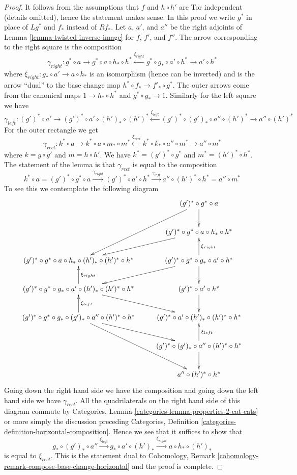\documentclass[10pt,a4paper]{amsart}
\theoremstyle{plain}
\theoremstyle{definition}
\theoremstyle{remark}
\numberwithin{equation}{subsection}
\begin{document}
\begin{proof}
It follows from the assumptions that $f$ and $h \circ h'$ are Tor
independent (details omitted), hence the statement makes sense.
In this proof we write $g^*$ in place of $Lg^*$ and $f_*$ instead
of $Rf_*$. Let $a$, $a'$, and $a''$ be the right adjoints of
Lemma \ref{lemma-twisted-inverse-image}
for $f$, $f'$, and $f''$. The arrow corresponding to the right
square is the composition
$$
\gamma_{right} :
g^* \circ a \to g^* \circ a \circ h_* \circ h^*
\xleftarrow{\xi_{right}} g^* \circ g_* \circ a' \circ h^* \to a' \circ h^*
$$
where $\xi_{right} : g_* \circ a' \to a \circ h_*$
is an isomorphism (hence can be inverted)
and is the arrow ``dual'' to the base change map
$h^* \circ f_* \to f'_* \circ g^*$. The outer arrows come
from the canonical maps $1 \to h_* \circ h^*$ and $g^* \circ g_* \to 1$.
Similarly for the left square we have
$$
\gamma_{left} :
(g')^* \circ a' \to (g')^* \circ a' \circ (h')_* \circ (h')^*
\xleftarrow{\xi_{left}}
(g')^* \circ (g')_* \circ a'' \circ (h')^* \to a'' \circ (h')^*
$$
For the outer rectangle we get
$$
\gamma_{rect} :
k^* \circ a \to
k^* \circ a \circ m_* \circ m^* \xleftarrow{\xi_{rect}}
k^* \circ k_* \circ a'' \circ m^* \to
a'' \circ m^*
$$
where $k = g \circ g'$ and $m = h \circ h'$.
We have $k^* = (g')^* \circ g^*$ and $m^* = (h')^* \circ h^*$.
The statement of the lemma is that $\gamma_{rect}$
is equal to the composition
$$
k^* \circ a =
(g')^* \circ g^* \circ a \xrightarrow{\gamma_{right}}
(g')^* \circ a' \circ h^* \xrightarrow{\gamma_{left}}
a'' \circ (h')^* \circ h^* = a'' \circ m^*
$$
To see this we contemplate the following diagram
$$
\xymatrix{
& (g')^* \circ g^* \circ a \ar[d] \ar[ddl] \\
& (g')^* \circ g^* \circ a \circ h_* \circ h^* \ar[ld] \\
(g')^* \circ g^* \circ a \circ h_* \circ (h')_* \circ (h')^* \circ h^* &
(g')^* \circ g^* \circ g_* \circ a' \circ h^*
\ar[u]_{\xi_{right}} \ar[d] \ar[ld] \\
(g')^* \circ g^* \circ g_* \circ a' \circ (h')_* \circ (h')^* \circ h^*
\ar[u]_{\xi_{right}} \ar[dr] &
(g')^* \circ a' \circ h^* \ar[d] \\
(g')^* \circ g^* \circ g_* \circ (g')_* \circ a'' \circ (h')^* \circ h^*
\ar[u]_{\xi_{left}} \ar[ddr] \ar[dr] &
(g')^* \circ a' \circ (h')_* \circ (h')^* \circ h^* \\
& (g')^*\circ (g')_* \circ a'' \circ (h')^* \circ h^*
\ar[u]_{\xi_{left}} \ar[d] \\
& a'' \circ (h')^* \circ h^*
}
$$
Going down the right hand side we have the composition and going
down the left hand side we have $\gamma_{rect}$.
All the quadrilaterals on the right hand side of this diagram commute
by Categories, Lemma \ref{categories-lemma-properties-2-cat-cats}
or more simply the discussion preceding
Categories, Definition \ref{categories-definition-horizontal-composition}.
Hence we see that it suffices to show that
$$
g_* \circ (g')_* \circ a'' \xrightarrow{\xi_{left}}
g_* \circ a' \circ (h')_* \xrightarrow{\xi_{right}}
a \circ h_* \circ (h')_*
$$
is equal to $\xi_{rect}$. This is the statement dual to
Cohomology, Remark \ref{cohomology-remark-compose-base-change-horizontal}
and the proof is complete.
\end{proof}
\end{document}
